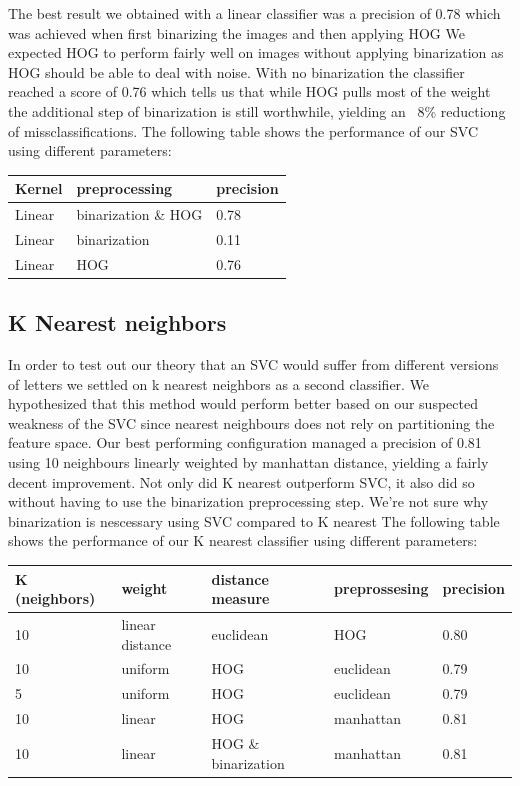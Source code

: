 \documentclass[paper=a4, fontsize=11pt]{scrartcl} %
\numberwithin{equation}{section} %
\numberwithin{figure}{section} %
\numberwithin{table}{section} %
\begin{document}
The best result we obtained with a linear classifier was a precision of 0.78 which was achieved when first binarizing the images and then applying HOG %
We expected HOG to perform fairly well on images without applying binarization as HOG should be able to deal with noise.
With no binarization the classifier reached a score of 0.76 which tells us that while HOG pulls most of the weight the additional step of binarization is still worthwhile, yielding an ~8\% reductiong of missclassifications.
The following table shows the performance of our SVC using different parameters: 
\begin{tabular}{l | l | l}
    Kernel & preprocessing & precision\\ \hline
    Linear & binarization \& HOG & 0.78 \\ \hline
    Linear & binarization & 0.11 \\ \hline
    Linear & HOG & 0.76\\ \hline
\end{tabular}

\subsection{K Nearest neighbors}
In order to test out our theory that an SVC would suffer from different versions of letters we settled on k nearest neighbors as a second classifier.
We hypothesized that this method would perform better based on our suspected weakness of the SVC since nearest neighbours does not rely on partitioning the feature space.
Our best performing configuration managed a precision of 0.81 using 10 neighbours linearly weighted by manhattan distance, yielding a fairly decent improvement.
Not only did K nearest outperform SVC, it also did so without having to use the binarization preprocessing step.
We're not sure why binarization is nescessary using SVC compared to K nearest %
The following table shows the performance of our K nearest classifier using different parameters: 
\begin{tabular}{l | l | l | l | l}
    K (neighbors) & weight & distance measure & preprossesing & precision\\ \hline
    10 & linear distance & euclidean & HOG & 0.80\\ \hline
    10 & uniform & HOG & euclidean & 0.79\\ \hline
    5 & uniform & HOG & euclidean & 0.79\\ \hline
    10 & linear & HOG & manhattan & 0.81\\ \hline
    10 & linear & HOG \& binarization & manhattan & 0.81\\ \hline
\end{tabular}
    
\end{document}
